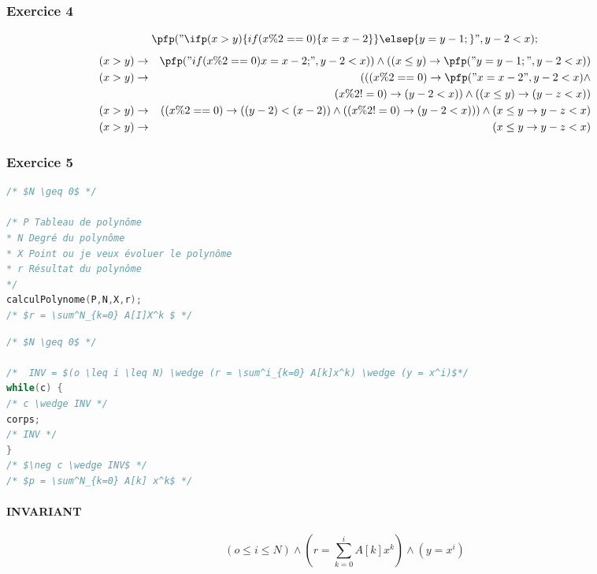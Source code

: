 \subsubsection{Exercice 4}
$$\pfp ("\ifp (x > y) \{ if(x \%2 ==  0) \{ x = x - 2\}\} \elsep \{y=y-1;\}", y-2 < x);$$
\begin{eqnarray*}
(x > y) &\rightarrow& \pfp("if(x\%2 == 0) { x = x-2; } ", y-2 < x)) \wedge ( ( x \leq y) \rightarrow \pfp ("y = y-1;", y - 2 < x) )\\
(x > y) &\rightarrow& ( ( (x \%2 = =0) \rightarrow \pfp ("x = x-2", y-2 < x) \wedge \\
& &(x \% 2 != 0) \rightarrow(y-2 < x)) \wedge ( (x \leq y) \rightarrow (y-z < x))\\ 
(x > y) &\rightarrow& ( (x\%2 = = 0)\rightarrow ( (y-2) < (x - 2) ) \wedge ( ( x\%2 != 0) \rightarrow (y-2 < x))) \wedge (x \leq y \rightarrow y-z < x) \\
(x > y) &\rightarrow& (x \leq y \rightarrow y - z < x)
\end{eqnarray*}

\subsubsection{Exercice 5}
\begin{lstlisting}[language=C]
/* $N \geq 0$ */

/* P Tableau de polynôme
* N Degré du polynôme
* X Point ou je veux évoluer le polynôme
* r Résultat du polynôme
*/
calculPolynome(P,N,X,r);
/* $r = \sum^N_{k=0} A[I]X^k $ */
\end{lstlisting}
\begin{lstlisting}[language=C]
/* $N \geq 0$ */

/*	INV = $(o \leq i \leq N) \wedge (r = \sum^i_{k=0} A[k]x^k) \wedge (y = x^i)$*/
while(c) {
/* c \wedge INV */
corps;
/* INV */
}
/* $\neg c \wedge INV$ */
/* $p = \sum^N_{k=0} A[k] x^k$ */
\end{lstlisting}
\paragraph{INVARIANT}
$$(o \leq i \leq N) \wedge (r = \sum^i_{k=0} A[k]x^k) \wedge (y = x^i)$$
